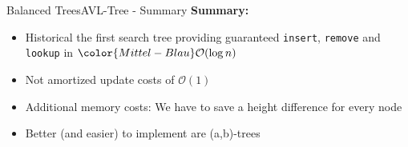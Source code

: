 \begin{frame}{Balanced Trees}{AVL-Tree - Summary}
  \textbf{Summary:}
  \begin{itemize}
    \item
      Historical the first search tree providing guaranteed
      \texttt{\color{Mittel-Blau}insert}, \texttt{\color{Mittel-Blau}remove}
      and \texttt{\color{Mittel-Blau}lookup} in
      ${\color{Mittel-Blau}\mathcal{O}(\log n)}$
    \item
      Not amortized update costs of $\mathcal{O}(1)$
    \item
      Additional memory costs:
      We have to save a height difference for every node
    \item
      Better (and easier) to implement are {\color{Mittel-Blau}(a,b)}-trees
  \end{itemize}
\end{frame}